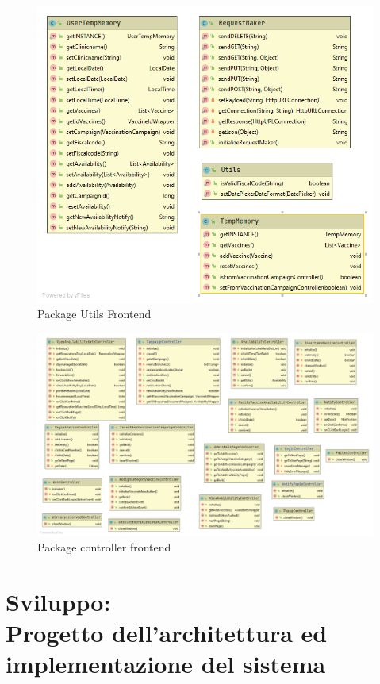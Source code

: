 \documentclass[a4paper,12pt,openany,oneside]{book}
\begin{document}
\begin{figure}[h] 
\centering
\includegraphics[width=0.8\columnwidth]{Package utils frontend.png} 
\caption{Package Utils Frontend} 
\end{figure}

\begin{figure}[h] 
\includegraphics[width=1.1\columnwidth]{Package controller frontend.png} 
\caption{Package controller frontend} 
\end{figure}

\newpage
\chapter{Sviluppo: {\\\normalfont Progetto dell'architettura ed implementazione del sistema}}
\end{document}
